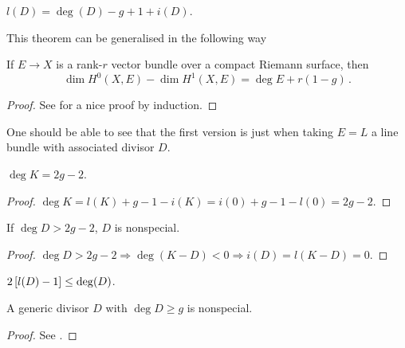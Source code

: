 \documentclass{article}
\begin{document}
\begin{theorem} \label{Thm: Riemann-Roch}
	$l(D) = \deg(D) -g+1 + i(D)$.
\end{theorem}
This theorem can be generalised in the following way
\begin{theorem}
	If $E\to X$ is a rank-$r$ vector bundle over a compact Riemann surface, then 
	\[
	\dim H^0(X,E) - \dim H^1(X,E) = \deg E + r(1-g) \, .
	\]
\end{theorem}
\begin{proof}
See \cite{Hitchin1999} for a nice proof by induction. 
\end{proof}
\begin{remark}
One should be able to see that the first version is just when taking $E=L$ a line bundle with associated divisor $D$. 
\end{remark}
\begin{corollary}
	$\deg K = 2g-2$. 
\end{corollary}
\begin{proof}
	$\deg K = l(K) +g-1-i(K) = i(0)+g-1-l(0)=2g-2$. 
\end{proof}

\begin{corollary}
	If $\deg D > 2g-2$, $D$ is nonspecial. 
\end{corollary}
\begin{proof}
	$\deg D >2g-2 \Rightarrow \deg(K-D)<0 \Rightarrow i(D) = l(K-D) = 0$. 
\end{proof}

\begin{corollary}
	$2\left[ l(D)-1 \right] \leq \deg(D)$. 
\end{corollary}

\begin{prop}\label{prop: generic divisor deg>=g is nonspecial}
	A generic divisor $D$ with $\deg D \geq g$ is nonspecial. 
\end{prop}
\begin{proof}
	See \cite{Dubrovin2009}.
\end{proof}
\end{document}
